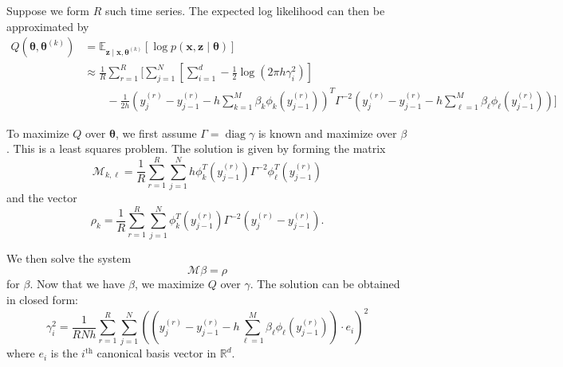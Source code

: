 \documentclass{article}
\newcommand{\btheta}{\ensuremath{\bm{\theta}}}
\newcommand{\opdiag}{\ensuremath{\operatorname{diag}}}
\newcommand{\bx}{\ensuremath{\mathbf{x}}}
\newcommand{\bz}{\ensuremath{\mathbf{z}}}
\begin{document}
Suppose we form $R$ such time series.  The expected log likelihood can then be approximated by
\begin{align*}
Q(\btheta, \btheta^{(k)}) &= \mathbb{E}_{\bz \mid \bx, \btheta^{(k)}} [\log p(\bx, \bz \mid \btheta)] \\
 &\approx \frac{1}{R} \sum_{r=1}^R \biggl[ \sum_{j=1}^N \left[ \sum_{i=1}^d -\frac{1}{2} \log (2 \pi h \gamma_i^2) \right] \\
 &\qquad -\frac{1}{2h} (y_j^{(r)} - y_{j-1}^{(r)} - h \sum_{k=1}^M \beta_k \phi_k(y_{j-1}^{(r)}))^T \Gamma^{-2} (y_j^{(r)} - y_{j-1}^{(r)} - h \sum_{\ell=1}^M \beta_\ell \phi_\ell(y_{j-1}^{(r)}) ) \biggr] 
\end{align*}

To maximize $Q$ over $\btheta$, we first assume $\Gamma = \opdiag \gamma$ is known and maximize over $\beta$.  This is a least squares problem.  The solution is given by forming the matrix
$$
\mathcal{M}_{k,\ell} = \frac{1}{R} \sum_{r=1}^{R} \sum_{j=1}^N h \phi_k^T (y_{j-1}^{(r)}) \Gamma^{-2} \phi_\ell^T (y_{j-1}^{(r)})
$$
and the vector
$$
\rho_k = \frac{1}{R} \sum_{r=1}^{R} \sum_{j=1}^N \phi_k^T (y_{j-1}^{(r)}) \Gamma^{-2} (y_j^{(r)} - y_{j-1}^{(r)}).
$$

We then solve the system
$$
\mathcal{M} \beta = \rho
$$
for $\beta$.  Now that we have $\beta$, we maximize $Q$ over $\gamma$.  The solution can be obtained in closed form:
$$
\gamma_i^2 = \frac{1}{R N h} \sum_{r=1}^{R} \sum_{j=1}^N (( y_j^{(r)} - y_{j-1}^{(r)} - h \sum_{\ell=1}^M \beta_\ell \phi_\ell (y_{j-1}^{(r)}) ) \cdot e_i )^2
$$
where $e_i$ is the $i^\text{th}$ canonical basis vector in $\mathbb{R}^d$.
\end{document}
